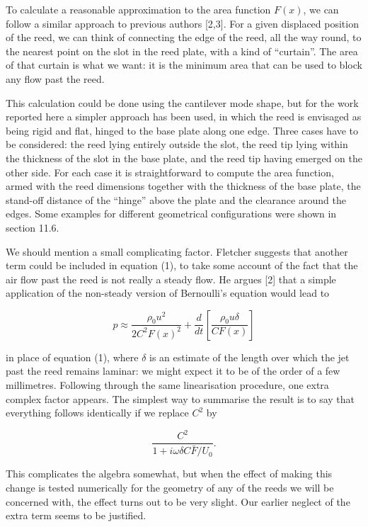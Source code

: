   To calculate a reasonable approximation to the area function $F(x)$, we can 
  follow a similar approach to previous authors [2,3]. For a given displaced 
  position of the reed, we can think of connecting the edge of the reed, all 
  the way round, to the nearest point on the slot in the reed plate, with a 
  kind of ``curtain''. The area of that curtain is what we want: it is the 
  minimum area that can be used to block any flow past the reed. 

  This calculation could be done using the cantilever mode shape, but for the 
  work reported here a simpler approach has been used, in which the reed is 
  envisaged as being rigid and flat, hinged to the base plate along one edge. 
  Three cases have to be considered: the reed lying entirely outside the slot, 
  the reed tip lying within the thickness of the slot in the base plate, and 
  the reed tip having emerged on the other side. For each case it is 
  straightforward to compute the area function, armed with the reed dimensions 
  together with the thickness of the base plate, the stand-off distance of the 
  ``hinge'' above the plate and the clearance around the edges. Some examples 
  for different geometrical configurations were shown in section 11.6. 

  We should mention a small complicating factor. Fletcher suggests that another 
  term could be included in equation (1), to take some account of the fact that 
  the air flow past the reed is not really a steady flow. He argues [2] that a 
  simple application of the non-steady version of Bernoulli's equation would 
  lead to 

  $$p \approx \dfrac{\rho_0 u^2}{2 C^2 F(x)^2} + \dfrac{d}{dt} \left[ 
  \dfrac{\rho_0 u \delta}{C F(x)} \right] \tag{18}$$ 

  in place of equation (1), where $\delta$ is an estimate of the length over 
  which the jet past the reed remains laminar: we might expect it to be of the 
  order of a few millimetres. Following through the same linearisation 
  procedure, one extra complex factor appears. The simplest way to summarise 
  the result is to say that everything follows identically if we replace $C^2$ 
  by 

  $$\dfrac{C^2}{1+i \omega \delta C \bar{F}/U_0}. \tag{19}$$ 

  This complicates the algebra somewhat, but when the effect of making this 
  change is tested numerically for the geometry of any of the reeds we will be 
  concerned with, the effect turns out to be very slight. Our earlier neglect 
  of the extra term seems to be justified. 

